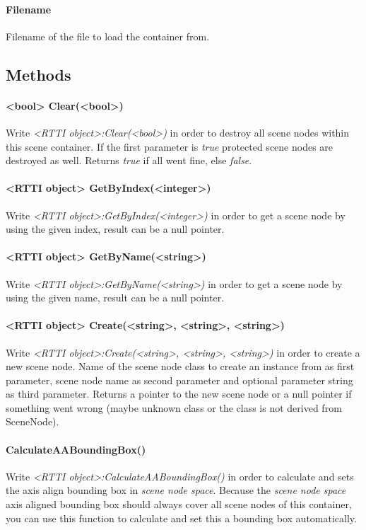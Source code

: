 \paragraph{Filename}
Filename of the file to load the container from.


\subsection{Methods}

\paragraph{<bool> Clear(<bool>)}
Write \emph{<RTTI object>:Clear(<bool>)} in order to destroy all scene nodes within this scene container. If the first parameter is \emph{true} protected scene nodes are destroyed as well. Returns \emph{true} if all went fine, else \emph{false}.

\paragraph{<RTTI object> GetByIndex(<integer>)}
Write \emph{<RTTI object>:GetByIndex(<integer>)} in order to get a scene node by using the given index, result can be a null pointer.

\paragraph{<RTTI object> GetByName(<string>)}
Write \emph{<RTTI object>:GetByName(<string>)} in order to get a scene node by using the given name, result can be a null pointer.

\paragraph{<RTTI object> Create(<string>, <string>, <string>)}
Write \emph{<RTTI object>:Create(<string>, <string>, <string>)} in order to create a new scene node. Name of the scene node class to create an instance from as first parameter, scene node name as second parameter and optional parameter string as third parameter. Returns a pointer to the new scene node or a null pointer if something went wrong (maybe unknown class or the class is not derived from SceneNode).

\paragraph{CalculateAABoundingBox()}
Write \emph{<RTTI object>:CalculateAABoundingBox()} in order to calculate and sets the axis align bounding box in \emph{scene node space}. Because the \emph{scene node space} axis aligned bounding box should always cover all scene nodes of this container, you can use this function to calculate and set this a bounding box automatically.

